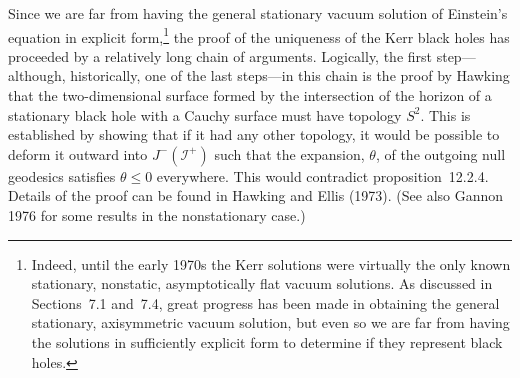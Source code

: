 Since we are far from having the general stationary vacuum solution of Einstein's
equation in explicit form,\footnote{Indeed, until the early 1970s the Kerr solutions
were virtually the only known stationary, nonstatic, asymptotically flat vacuum
solutions. As discussed in Sections~7.1 and~7.4, great progress has been made in
obtaining the general stationary, axisymmetric vacuum solution, but even so we are
far from having the solutions in sufficiently explicit form to determine if they
represent black holes.} the proof of the uniqueness of the Kerr black holes has
proceeded by a relatively long chain of arguments. Logically, the first step---although,
historically, one of the last steps---in this chain is the proof by Hawking that the
two-dimensional surface formed by the intersection of the horizon of a stationary
black hole with a Cauchy surface must have topology \(S^2\). This is established by
showing that if it had any other topology, it would be possible to deform it outward
into \(J^-(\mathcal I^+)\) such that the expansion, \(\theta\), of the outgoing null
geodesics satisfies \(\theta\le0\) everywhere. This would contradict
proposition~12.2.4. Details of the proof can be found in Hawking and Ellis (1973).
(See also Gannon 1976 for some results in the nonstationary case.)

